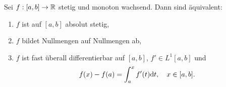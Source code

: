 Sei $f:[a,b]\to\mathbb{R}$ stetig und monoton wachsend. Dann sind äquivalent:
\begin{enumerate}
\item $f$ ist auf $[a,b]$ absolut stetig,
\item $f$ bildet Nullmengen auf Nullmengen ab,
\item $f$ ist fast überall differentierbar auf $[a,b]$, $f'\in L^1[a,b]$ und
\begin{equation*}
    f(x)-f(a)=\int_a^x f'(t) \mathrm{d} t, \quad x\in[a,b].
\end{equation*}
\end{enumerate}
